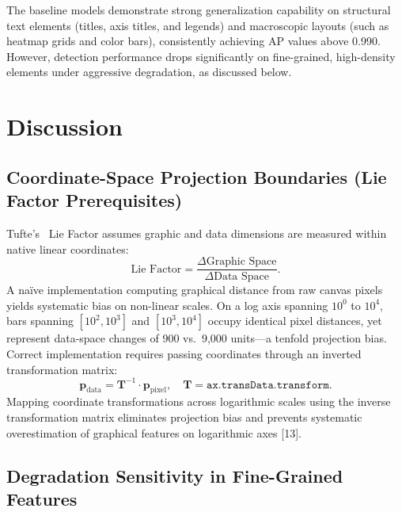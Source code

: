 \documentclass[11pt,twocolumn]{article}
\begin{document}
The baseline models demonstrate strong generalization capability on structural text elements (titles, axis titles, and legends) and macroscopic layouts (such as heatmap grids and color bars), consistently achieving AP values above 0.990. However, detection performance drops significantly on fine-grained, high-density elements under aggressive degradation, as discussed below.

\section{Discussion}\label{sec:discussion}

\subsection{Coordinate-Space Projection Boundaries (Lie Factor Prerequisites)}\label{sec:liefactor}

Tufte's~\cite{tufte2001} Lie Factor assumes graphic and data dimensions are measured within native linear coordinates:
\begin{equation}\label{eq:lie}
  \text{Lie Factor} = \frac{\Delta\text{Graphic Space}}{\Delta\text{Data Space}}.
\end{equation}
A na\"ive implementation computing graphical distance from raw canvas pixels yields systematic bias on non-linear scales. On a log axis spanning $10^0$ to $10^4$, bars spanning $[10^2,10^3]$ and $[10^3,10^4]$ occupy identical pixel distances, yet represent data-space changes of 900 vs.\ 9{,}000 units---a tenfold projection bias. Correct implementation requires passing coordinates through an inverted transformation matrix:
\begin{equation}\label{eq:lie_inv}
  \mathbf{p}_{\text{data}} = \mathbf{T}^{-1}\cdot\mathbf{p}_{\text{pixel}},\quad \mathbf{T} = \texttt{ax.transData.transform}.
\end{equation}
Mapping coordinate transformations across logarithmic scales using the inverse transformation matrix eliminates projection bias and prevents systematic overestimation of graphical features on logarithmic axes [13].

\subsection{Degradation Sensitivity in Fine-Grained Features}\label{sec:sensitivity}
\end{document}
